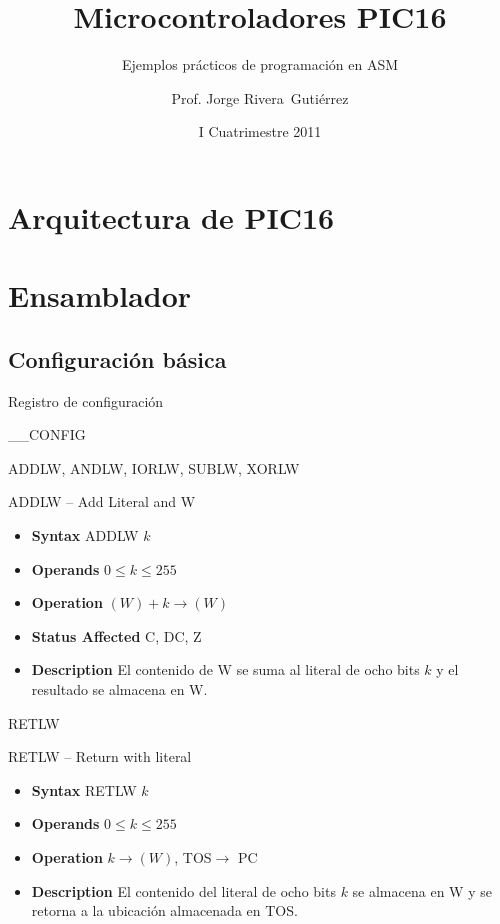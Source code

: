 \documentclass[xcolor=dvipsnames,handout]{beamer}
\title[PIC16]{Microcontroladores PIC16}
\subtitle[ASM 2]{Ejemplos prácticos de programación en ASM}
\author{Prof. Jorge Rivera~Guti\'errez}
\institute{Universidad Latina de Costa Rica\\ Ingenier\'\i a en Electr\'onica}
\date{I Cuatrimestre 2011}
\begin{document}
\begin{frame}
 \maketitle
\end{frame}

\begin{frame}
 \tableofcontents[pausesections]
\end{frame}

\section{Arquitectura de PIC16}


\section{Ensamblador}

\subsection[Config]{Configuración básica} %
\begin{frame}{Registro de configuración}
  \begin{block}{__CONFIG}
    
  \end{block}
\end{frame}

\begin{frame}{ADDLW, ANDLW, IORLW, SUBLW, XORLW}
  \begin{block}{ADDLW -- Add Literal and W}
      \begin{itemize}
	\item\textbf{Syntax} ADDLW $k$
	\item\textbf{Operands} $0\leq k\leq 255$
	\item\textbf{Operation} $(W)+k\rightarrow (W)$
	\item\textbf{Status Affected} C, DC, Z
	\item\textbf{Description} El contenido de W se suma al literal de ocho bits $k$ y el resultado se almacena en W.
      \end{itemize}      
  \end{block}
\end{frame}

\begin{frame}{RETLW}
  \begin{block}{RETLW -- Return with literal}

      \begin{itemize}
	\item\textbf{Syntax} RETLW $k$
	\item\textbf{Operands} $0\leq k\leq 255$
	\item\textbf{Operation} $k\rightarrow (W)$, TOS$\rightarrow$ PC
	\item\textbf{Description} El contenido del literal de ocho bits $k$ se almacena en W y se retorna a la ubicación almacenada en TOS.
      \end{itemize} 
  \end{block}
\end{frame}
\end{document}
